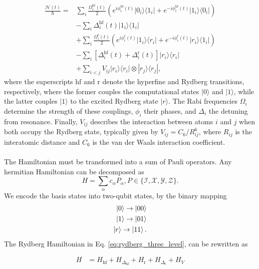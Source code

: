 \documentclass[amssymb,twocolumn,aps]{revtex4-2}
\begin{document}
\begin{equation}
\begin{aligned}
\frac{\mathcal{H}(t)}{\hbar}
={}&
\sum_i \frac{\Omega_i^{\mathrm{hf}}(t)}{2}
\left(
e^{i\phi_i^{\mathrm{hf}}(t)}
|0_i\rangle\langle 1_i|
+
e^{-i\phi_i^{\mathrm{hf}}(t)}
|1_i\rangle\langle 0_i|
\right)
\\
&-
\sum_i \Delta_i^{\mathrm{hf}}(t)
|1_i\rangle\langle 1_i|
\\
&+
\sum_i \frac{\Omega_i^{\mathrm{r}}(t)}{2}
\left(
e^{i\phi_i^{\mathrm{r}}(t)}
|1_i\rangle\langle r_i|
+
e^{-i\phi_i^{\mathrm{r}}(t)}
|r_i\rangle\langle 1_i|
\right)
\\
&-
\sum_i
\left[
\Delta_i^{\mathrm{hf}}(t)
+
\Delta_i^{\mathrm{r}}(t)
\right]
|r_i\rangle\langle r_i|
\\
&+
\sum_{i<j} V_{ij}
|r_i\rangle\langle r_i|
\otimes
|r_j\rangle\langle r_j|,
\end{aligned}
\label{eq:rydberg_three_level}
\end{equation}
where the superscripts \(\mathrm{hf}\) and \(\mathrm{r}\) denote the hyperfine and Rydberg transitions, respectively, where the former couples the computational states \(|0\rangle\) and \(|1\rangle\), while the latter couples \(|1\rangle\) to the excited Rydberg state \(|r\rangle\). The Rabi frequencies \(\Omega_i\) determine the strength of these couplings, \(\phi_i\) their phases, and \(\Delta_i\) the detuning from resonance. Finally, \(V_{ij}\) describes the interaction between atoms \(i\) and \(j\) when both occupy the Rydberg state, typically given by \(V_{ij}=C_6/R_{ij}^6\), where \(R_{ij}\) is the interatomic distance and \(C_6\) is the van der Waals interaction coefficient.\\\\
The Hamiltonian must be transformed into a sum of Pauli operators. Any hermitian Hamiltonian can be decomposed as
\begin{equation}
    H = \sum_\alpha c_\alpha P_\alpha, P \in \{\mathcal{I}, \mathcal{X}, \mathcal{Y}, \mathcal{Z}\}.
\end{equation}
We encode the basis states into two-qubit states, by the binary mapping
\begin{align*}
    \ket{0} \to \ket{00}\\
    \ket{1} \to \ket{01}\\
    \ket{r} \to \ket{11}.
\end{align*}
The Rydberg Hamiltonian in Eq. \ref{eq:rydberg_three_level}, can be rewritten as

\begin{align*}
    H &= H_{\mathrm{hf}} + H_{\Delta_{\mathrm{hf}}}
       + H_{\mathrm{r}} + H_{\Delta_{\mathrm{r}}} + H_V
\end{align*}
\end{document}
